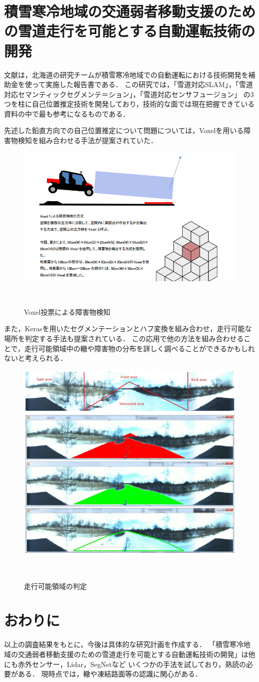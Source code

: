 \documentclass[a4paper]{jarticle}
\begin{document}
\section{積雪寒冷地域の交通弱者移動支援のための雪道走行を可能とする自動運転技術の開発}
文献\cite{2910102026:online}は，北海道の研究チームが積雪寒冷地域での自動運転における技術開発を補助金を使って実施した報告書である．
この研究では，「雪道対応SLAM」，「雪道対応セマンティックセグメンテ＝ション」，「雪道対応センサフュージョン」
の3つを柱に自己位置推定技術を開発しており，技術的な面では現在把握できている資料の中で最も参考になるものである．

先述した鉛直方向での自己位置推定について問題については，Voxelを用いる障害物検知を組み合わせる手法が提案されていた．

\begin{figure}[H]
  \centering
  \includegraphics[width=0.5\linewidth]{picture/voxel.png}
  \caption{Voxel投票による障害物検知}　
  \label{voxel}
\end{figure}

また，Kerasを用いたセグメンテーションとハフ変換を組み合わせ，走行可能な場所を判定する手法も提案されている．
この応用で他の方法を組み合わせることで，走行可能領域中の轍や障害物の分布を詳しく調べることができるかもしれないと考えられる．

\begin{figure}[H]
  \centering
  \includegraphics[width=0.5\linewidth]{picture/soukou.png}
  \caption{走行可能領域の判定}　
  \label{voxel}
\end{figure}

%
\section{おわりに}
%
以上の調査結果をもとに，今後は具体的な研究計画を作成する．
「積雪寒冷地域の交通弱者移動支援のための雪道走行を可能とする自動運転技術の開発」は他にも赤外センサー，Lidar，SegNetなど
いくつかの手法を試しており，熟読の必要がある．
現時点では，轍や凍結路面等の認識に関心がある．
%
%


%
\end{document}
